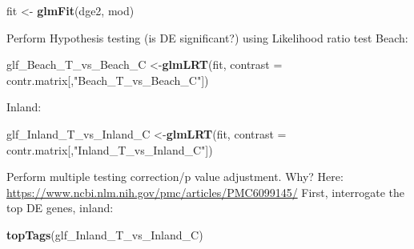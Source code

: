 \documentclass[
]{article}
\newenvironment{Shaded}{\begin{snugshade}}{\end{snugshade}}
\newcommand{\DataTypeTok}[1]{\textcolor[rgb]{0.13,0.29,0.53}{#1}}
\newcommand{\KeywordTok}[1]{\textcolor[rgb]{0.13,0.29,0.53}{\textbf{#1}}}
\newcommand{\NormalTok}[1]{#1}
\newcommand{\StringTok}[1]{\textcolor[rgb]{0.31,0.60,0.02}{#1}}
\begin{document}
\begin{Shaded}
\begin{Highlighting}[]
\NormalTok{fit <-}\StringTok{ }\KeywordTok{glmFit}\NormalTok{(dge2, mod)}
\end{Highlighting}
\end{Shaded}

Perform Hypothesis testing (is DE significant?) using Likelihood ratio
test Beach:

\begin{Shaded}
\begin{Highlighting}[]
\NormalTok{  glf_Beach_T_vs_Beach_C <-}\KeywordTok{glmLRT}\NormalTok{(fit, }\DataTypeTok{contrast =}\NormalTok{ contr.matrix[,}\StringTok{"Beach_T_vs_Beach_C"}\NormalTok{])}
\end{Highlighting}
\end{Shaded}

Inland:

\begin{Shaded}
\begin{Highlighting}[]
\NormalTok{  glf_Inland_T_vs_Inland_C <-}\KeywordTok{glmLRT}\NormalTok{(fit, }\DataTypeTok{contrast =}\NormalTok{ contr.matrix[,}\StringTok{"Inland_T_vs_Inland_C"}\NormalTok{])}
\end{Highlighting}
\end{Shaded}

Perform multiple testing correction/p value adjustment. Why? Here:
\url{https://www.ncbi.nlm.nih.gov/pmc/articles/PMC6099145/} First,
interrogate the top DE genes, inland:

\begin{Shaded}
\begin{Highlighting}[]
\KeywordTok{topTags}\NormalTok{(glf_Inland_T_vs_Inland_C)}
\end{Highlighting}
\end{Shaded}
\end{document}
